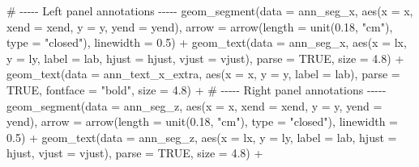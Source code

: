 \documentclass[
  letterpaper,
  DIV=11,
  numbers=noendperiod]{scrreprt}
\newenvironment{Shaded}{\begin{snugshade}}{\end{snugshade}}
\newcommand{\AttributeTok}[1]{\textcolor[rgb]{0.40,0.45,0.13}{#1}}
\newcommand{\CommentTok}[1]{\textcolor[rgb]{0.37,0.37,0.37}{#1}}
\newcommand{\ConstantTok}[1]{\textcolor[rgb]{0.56,0.35,0.01}{#1}}
\newcommand{\FloatTok}[1]{\textcolor[rgb]{0.68,0.00,0.00}{#1}}
\newcommand{\FunctionTok}[1]{\textcolor[rgb]{0.28,0.35,0.67}{#1}}
\newcommand{\NormalTok}[1]{\textcolor[rgb]{0.00,0.23,0.31}{#1}}
\newcommand{\SpecialCharTok}[1]{\textcolor[rgb]{0.37,0.37,0.37}{#1}}
\newcommand{\StringTok}[1]{\textcolor[rgb]{0.13,0.47,0.30}{#1}}
\begin{document}
\begin{Shaded}
\begin{Highlighting}[]
  \CommentTok{\# {-}{-}{-}{-}{-} Left panel annotations {-}{-}{-}{-}{-}}
  \FunctionTok{geom\_segment}\NormalTok{(}\AttributeTok{data =}\NormalTok{ ann\_seg\_x,}
               \FunctionTok{aes}\NormalTok{(}\AttributeTok{x =}\NormalTok{ x, }\AttributeTok{xend =}\NormalTok{ xend, }\AttributeTok{y =}\NormalTok{ y, }\AttributeTok{yend =}\NormalTok{ yend),}
               \AttributeTok{arrow =} \FunctionTok{arrow}\NormalTok{(}\AttributeTok{length =} \FunctionTok{unit}\NormalTok{(}\FloatTok{0.18}\NormalTok{, }\StringTok{"cm"}\NormalTok{), }\AttributeTok{type =} \StringTok{"closed"}\NormalTok{),}
               \AttributeTok{linewidth =} \FloatTok{0.5}\NormalTok{) }\SpecialCharTok{+}
  \FunctionTok{geom\_text}\NormalTok{(}\AttributeTok{data =}\NormalTok{ ann\_seg\_x,}
            \FunctionTok{aes}\NormalTok{(}\AttributeTok{x =}\NormalTok{ lx, }\AttributeTok{y =}\NormalTok{ ly, }\AttributeTok{label =}\NormalTok{ lab, }\AttributeTok{hjust =}\NormalTok{ hjust, }\AttributeTok{vjust =}\NormalTok{ vjust),}
            \AttributeTok{parse =} \ConstantTok{TRUE}\NormalTok{, }\AttributeTok{size =} \FloatTok{4.8}\NormalTok{) }\SpecialCharTok{+}
  \FunctionTok{geom\_text}\NormalTok{(}\AttributeTok{data =}\NormalTok{ ann\_text\_x\_extra,}
            \FunctionTok{aes}\NormalTok{(}\AttributeTok{x =}\NormalTok{ x, }\AttributeTok{y =}\NormalTok{ y, }\AttributeTok{label =}\NormalTok{ lab),}
            \AttributeTok{parse =} \ConstantTok{TRUE}\NormalTok{, }\AttributeTok{fontface =} \StringTok{"bold"}\NormalTok{, }\AttributeTok{size =} \FloatTok{4.8}\NormalTok{) }\SpecialCharTok{+}
  \CommentTok{\# {-}{-}{-}{-}{-} Right panel annotations {-}{-}{-}{-}{-}}
  \FunctionTok{geom\_segment}\NormalTok{(}\AttributeTok{data =}\NormalTok{ ann\_seg\_z,}
               \FunctionTok{aes}\NormalTok{(}\AttributeTok{x =}\NormalTok{ x, }\AttributeTok{xend =}\NormalTok{ xend, }\AttributeTok{y =}\NormalTok{ y, }\AttributeTok{yend =}\NormalTok{ yend),}
               \AttributeTok{arrow =} \FunctionTok{arrow}\NormalTok{(}\AttributeTok{length =} \FunctionTok{unit}\NormalTok{(}\FloatTok{0.18}\NormalTok{, }\StringTok{"cm"}\NormalTok{), }\AttributeTok{type =} \StringTok{"closed"}\NormalTok{),}
               \AttributeTok{linewidth =} \FloatTok{0.5}\NormalTok{) }\SpecialCharTok{+}
  \FunctionTok{geom\_text}\NormalTok{(}\AttributeTok{data =}\NormalTok{ ann\_seg\_z,}
            \FunctionTok{aes}\NormalTok{(}\AttributeTok{x =}\NormalTok{ lx, }\AttributeTok{y =}\NormalTok{ ly, }\AttributeTok{label =}\NormalTok{ lab, }\AttributeTok{hjust =}\NormalTok{ hjust, }\AttributeTok{vjust =}\NormalTok{ vjust),}
            \AttributeTok{parse =} \ConstantTok{TRUE}\NormalTok{, }\AttributeTok{size =} \FloatTok{4.8}\NormalTok{) }\SpecialCharTok{+}

\end{Highlighting}
\end{Shaded}
\end{document}
